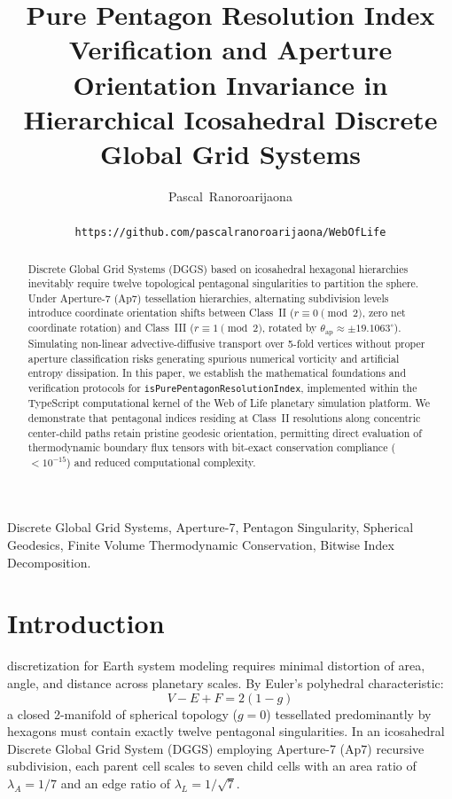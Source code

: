\documentclass[10pt,journal,compsoc]{IEEEtran}
\title{Pure Pentagon Resolution Index Verification and Aperture Orientation Invariance in Hierarchical Icosahedral Discrete Global Grid Systems}
\author{Pascal~Ranoroarijaona\\
\IEEEmembership{Chief Systems Architect, Web of Life Initiative}\\
\texttt{https://github.com/pascalranoroarijaona/WebOfLife}}
\begin{document}
\maketitle

\begin{abstract}
Discrete Global Grid Systems (DGGS) based on icosahedral hexagonal hierarchies inevitably require twelve topological pentagonal singularities to partition the sphere. Under Aperture-7 ($\mathrm{Ap}7$) tessellation hierarchies, alternating subdivision levels introduce coordinate orientation shifts between Class~II ($r \equiv 0 \pmod 2$, zero net coordinate rotation) and Class~III ($r \equiv 1 \pmod 2$, rotated by $\theta_{\mathrm{ap}} \approx \pm 19.1063^{\circ}$). Simulating non-linear advective-diffusive transport over 5-fold vertices without proper aperture classification risks generating spurious numerical vorticity and artificial entropy dissipation. In this paper, we establish the mathematical foundations and verification protocols for \texttt{isPurePentagonResolutionIndex}, implemented within the TypeScript computational kernel of the Web of Life planetary simulation platform. We demonstrate that pentagonal indices residing at Class~II resolutions along concentric center-child paths retain pristine geodesic orientation, permitting direct evaluation of thermodynamic boundary flux tensors with bit-exact conservation compliance ($<10^{-15}$) and reduced computational complexity.
\end{abstract}

\begin{IEEEkeywords}
Discrete Global Grid Systems, Aperture-7, Pentagon Singularity, Spherical Geodesics, Finite Volume Thermodynamic Conservation, Bitwise Index Decomposition.
\end{IEEEkeywords}

\section{Introduction}
 discretization for Earth system modeling requires minimal distortion of area, angle, and distance across planetary scales. By Euler's polyhedral characteristic:
\begin{equation}
V - E + F = 2(1 - g)
\end{equation}
a closed 2-manifold of spherical topology ($g=0$) tessellated predominantly by hexagons must contain exactly twelve pentagonal singularities. In an icosahedral Discrete Global Grid System (DGGS) employing Aperture-7 ($\mathrm{Ap}7$) recursive subdivision, each parent cell scales to seven child cells with an area ratio of $\lambda_A = 1/7$ and an edge ratio of $\lambda_L = 1/\sqrt{7}$.
\end{document}

